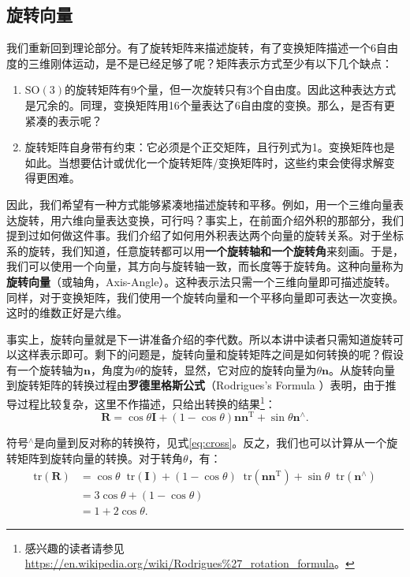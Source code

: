 \subsection{旋转向量}
我们重新回到理论部分。有了旋转矩阵来描述旋转，有了变换矩阵描述一个6自由度的三维刚体运动，是不是已经足够了呢？矩阵表示方式至少有以下几个缺点：

\begin{enumerate}
	\item $\mathrm{SO}(3)$的旋转矩阵有9个量，但一次旋转只有3个自由度。因此这种表达方式是冗余的。同理，变换矩阵用16个量表达了6自由度的变换。那么，是否有更紧凑的表示呢？
	\item 旋转矩阵自身带有约束：它必须是个正交矩阵，且行列式为1。变换矩阵也是如此。当想要估计或优化一个旋转矩阵/变换矩阵时，这些约束会使得求解变得更困难。
\end{enumerate}

因此，我们希望有一种方式能够紧凑地描述旋转和平移。例如，用一个三维向量表达旋转，用六维向量表达变换，可行吗？事实上，在前面介绍外积的那部分，我们提到过如何做这件事。我们介绍了如何用外积表达两个向量的旋转关系。对于坐标系的旋转，我们知道，任意旋转都可以用\textbf{一个旋转轴和一个旋转角}来刻画。于是，我们可以使用一个向量，其方向与旋转轴一致，而长度等于旋转角。这种向量称为\textbf{旋转向量}（或轴角，Axis-Angle）。这种表示法只需一个三维向量即可描述旋转。同样，对于变换矩阵，我们使用一个旋转向量和一个平移向量即可表达一次变换。这时的维数正好是六维。

事实上，旋转向量就是下一讲准备介绍的李代数。所以本讲中读者只需知道旋转可以这样表示即可。剩下的问题是，旋转向量和旋转矩阵之间是如何转换的呢？假设有一个旋转轴为$\bm{n}$，角度为$\theta$的旋转，显然，它对应的旋转向量为$\theta \bm{n}$。从旋转向量到旋转矩阵的转换过程由\textbf{罗德里格斯公式}（Rodrigues's Formula ）表明，由于推导过程比较复杂，这里不作描述，只给出转换的结果\footnote{感兴趣的读者请参见\url{https://en.wikipedia.org/wiki/Rodrigues\%27_rotation_formula}。}：
\begin{equation}
\label{eq:rogridues}
\bm{R} = \cos \theta \bm{I} + \left( {1 - \cos \theta } \right) \bm{n}{\bm{n}^\mathrm{T}} + \sin \theta { \bm{n}^ \wedge }.
\end{equation}

符号$^\wedge$是向量到反对称的转换符，见式\eqref{eq:cross}。反之，我们也可以计算从一个旋转矩阵到旋转向量的转换。对于转角$\theta$，有：
\begin{equation}
\begin{aligned}
  \mathrm{tr} \left( \bm{R} \right) &= \cos \theta \mathop{}\!\mathrm{tr}\left( \bm{I} \right) + \left( {1 - \cos \theta } \right) \mathop{}\!\mathrm{tr} \left( { \bm{n} {\bm{n}^\mathrm{T}}} \right) + \sin \theta \mathop{}\!\mathrm{tr} ({\bm{n}^ \wedge })\\
&= 3\cos \theta  + (1 - \cos \theta )\\
&= 1 + 2\cos \theta .
\end{aligned} 
\end{equation}

